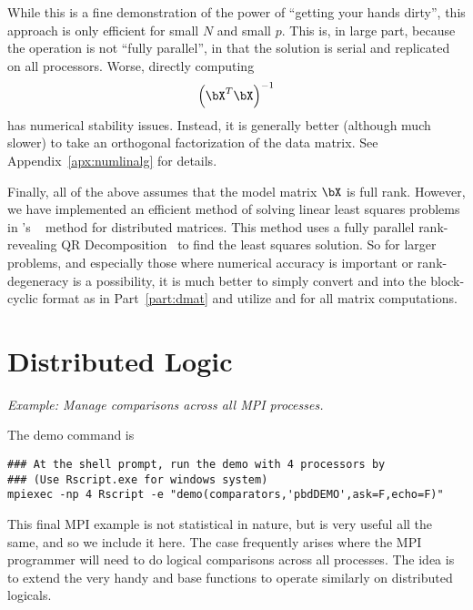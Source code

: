 While this is a fine demonstration of the power of
``getting your hands dirty'', this approach is only efficient for
small $N$ and small $p$. This is, in large part, because the operation
is not ``fully parallel'', in that the solution is serial and replicated
on all processors. Worse, directly computing
\begin{align*}
\left(\bX^T\bX\right)^{-1}
\end{align*}
has numerical stability issues. Instead, it is generally better
(although much slower) to take an orthogonal factorization of the data matrix.
See Appendix~\ref{apx:numlinalg} for details.

Finally, all of the above assumes that the model matrix $\bX$ is full rank.
However, we have implemented an efficient method of solving linear least
squares problems in 's
~
method for distributed matrices. This method uses a fully parallel
rank-revealing QR Decomposition~
to find the least squares solution. So for larger problems, and especially
those where numerical accuracy is important or rank-degeneracy is
a possibility, it is much better to simply convert
 and 
into the block-cyclic format as
in Part~\ref{part:dmat} and utilize  and 
for all matrix computations.








\section{Distributed Logic}%

\emph{Example:  Manage comparisons across all MPI processes.}

The demo command is
\begin{lstlisting}
### At the shell prompt, run the demo with 4 processors by
### (Use Rscript.exe for windows system)
mpiexec -np 4 Rscript -e "demo(comparators,'pbdDEMO',ask=F,echo=F)"
\end{lstlisting}

This final MPI example is not statistical in nature, but is very useful
all the same, and so we include it here. The case frequently arises where
the MPI programmer will need to do logical comparisons across all processes.
The idea is to extend the very handy  and 
base  functions to operate similarly on distributed logicals.

